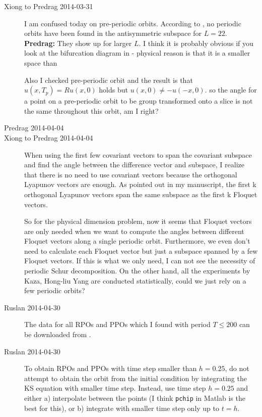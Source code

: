 \begin{description}
\item[Xiong to Predrag 2014-03-31]
I am confused today on pre-periodic orbits. According to , no
periodic orbits have been found in the antisymmetric
subspace \KSe for $L=22$. {\bf Predrag:} They show up for larger $L$. I think
it is probably obvious if you look at the bifurcation diagram in
 - physical reason is that it is a smaller space
than


Also I checked pre-periodic orbit 
and the result is that $u(x,T_{p})=Ru(x,0)$ holds but $u(x,0)\neq -u(-x,0)$.
so the angle for a point on a pre-periodic orbit to be group transformed
onto a slice is not the same throughout this orbit, am I right?

\item[Predrag 2014-04-04]


\item[Xiong to Predrag 2014-04-04]
When using the first few covariant vectors to span the covariant subspace and find the angle
between the difference vector and subspace, I realize that there is no need to use covariant
vectors because the orthogonal Lyapunov vectors are enough. As pointed out in my manuscript,
the first k orthogonal Lyapunov vectors span the same subspace as the first k Floquet vectors.

So for the physical dimension problem, now it seems that Floquet vectors are only needed when
we want to compute the angles between different Floquet vectors along a single periodic orbit.
Furthermore, we even don't need to calculate each Floquet vector but just a subspace spanned
by a few Floquet vectors. If this is what we only need, I can not see the necessity of periodic
Schur decomposition. On the other hand, all the experiments by Kaza, Hong-liu Yang
are conducted statistically, could we just rely on a few periodic orbits?

\item[Ruslan 2014-04-30] The data for all RPOs and PPOs which I found
with period $T \leq 200$ can be downloaded from
.

\item[Ruslan 2014-04-30] To obtain RPOs and PPOs with time step smaller than $h=0.25$, do not attempt to obtain the orbit from the initial condition by integrating the KS equation with smaller time step. Instead, use time step $h=0.25$ and either a) interpolate between the points (I think {\tt pchip} in Matlab is the best for this), or b) integrate with smaller time step only up to $t = h$.



\end{description}
